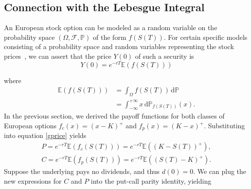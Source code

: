 \documentclass[]{article}
\newcommand{\EE}{\mathbb{E}}
\newcommand{\PP}{\mathbb{P}}
\theoremstyle{definition}
\theoremstyle{remark}
\begin{document}
\subsection{Connection with the Lebesgue Integral}
An European stock option can be modeled as a random variable on the probability space $(\Omega, \mathcal{F}, \PP)$ of the form $f(S(T))$. For certain specific models consisting of a probability space and random variables representing the stock prices~\cite{capinski2004measure}, we can assert that the price $Y(0)$ of such a security is
\begin{equation} \label{gprice}
	Y(0) = e^{-rT} \EE(f(S(T)))
\end{equation}

where
\begin{align*}
\EE(f(S(T))) &= \int_\Omega f(S(T))  \, \text{d} \PP \\
&= \int_{- \infty}^{+ \infty} x \,\text{d} \PP_{f(S(T))}(x).
\end{align*}
In the previous section, we derived the payoff functions for both classes of European options $f_c (x) = (x - K)^+$ and $f_p (x) = (K - x)^+$. Substituting into equation \ref{gprice} yields
\begin{gather*}
	P = e^{-rT} \EE(f_c(S(T))) =e^{-rT}  \EE((K - S(T))^+), \\
	C = e^{-rT} \EE(f_p(S(T))) =  e^{-rT} \EE((S(T) - K)^+).
\end{gather*}
Suppose the underlying pays no dividends, and thus $d(0)=0$. We can plug the new expressions for $C$ and $P$ into the put-call parity identity, yielding
\end{document}
